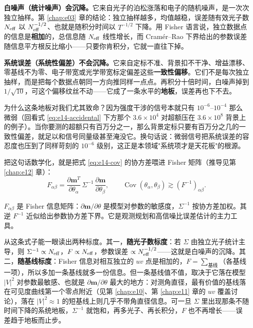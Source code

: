 \textbf{白噪声（统计噪声）会沉降。}它来自光子的泊松涨落和电子的随机噪声，是一次次独立抽样。第 \ref{chap:e03} 章的结论：独立抽样越多，均值越稳，误差随有效光子数 \(N_{\rm eff}\) 以 \(N_{\rm eff}^{-1/2}\)、也就是随积分时间以 \(T^{-1/2}\) 下降。用 Fisher 语言说，独立数据点的信息是\textbf{相加}的，总信息随 \(N_{\rm eff}\) 线性增长，而 Cramér–Rao 下界给出的参数误差随信息平方根反比缩小——只要你肯积分，它就一直往下掉。

\textbf{系统误差（系统性偏差）不会沉降。}它来自定标不准、背景扣不干净、增益漂移、零基线不为零、电子带宽或光学带宽标定偏差这些\textbf{一致性偏移}。它们不是每次独立抽样，而是把每个数据点朝同一方向推同样一点点。再积分十倍时间，白噪声掉到 \(1/\sqrt{10}\)，可这个偏移纹丝不动——它成了一条水平的\textbf{地板}，误差再也下不去。

为什么这条地板对我们尤其致命？因为强度干涉的信号本就只有 \(10^{-6}\)–\(10^{-4}\) 那么微弱（回看式 \eqref{eq:e14-accidental} 下方那个 \(3.6\times10^4\) 对超额压在 \(3.6\times10^8\) 背景上的例子）。当你要测的超额只有百万分之一，那么背景定标只要有百万分之几的一致性偏差，就足以和信号同量级甚至淹没它。换句话说：微弱信号把系统误差的容忍度也压到了同样苛刻的 \(10^{-6}\) 级别，这正是本领域"系统项才是天花板"的根源。

把这句话数学化，就是把式 \eqref{eq:e14-cov} 的协方差喂进 Fisher 矩阵（推导见第 \ref{chap:e12} 章）：
\begin{equation}
  F_{\alpha\beta}
  =\frac{\partial\bm m^{T}}{\partial\theta_\alpha}\,\Sigma^{-1}\,\frac{\partial\bm m}{\partial\theta_\beta},
  \qquad
  \operatorname{Cov}(\theta_\alpha,\theta_\beta)\gtrsim(F^{-1})_{\alpha\beta} .
  \label{eq:e14-fisher}
\end{equation}
\begin{formulaexplain}
\(F_{\alpha\beta}\) 是 Fisher 信息矩阵：\(\partial\bm m/\partial\theta\) 是模型对参数的敏感度，\(\Sigma^{-1}\) 按协方差加权。其逆 \(F^{-1}\) 近似给出参数协方差下界。它是观测规划和高信噪比误差估计的主力工具。
\end{formulaexplain}
从这条式子能一眼读出两种标度。其一，\textbf{随光子数标度}：若 \(\Sigma\) 由独立光子统计主导，则 \(\Sigma^{-1}\propto N_{\rm eff}\)，\(F\propto N_{\rm eff}\)，参数误差 \(\propto N_{\rm eff}^{-1/2}\)——这就是白噪声的沉降。其二，\textbf{随基线标度}：Fisher 信息对相互独立的 \(uv\) 点是相加的，\(F=\sum_{\text{基线}}\)（各基线一项），所以多加一条基线就多一份信息。但一条基线值不值，取决于它落在模型 \(|V|^2\) 对参数最敏感、也就是 \(\partial\bm m/\partial\theta\) 最大的地方：对测角直径，最有价值的基线落在可见度曲线第一个零点附近（见第 \ref{chap:e10}、第 \ref{chap:e11} 章的 \(uv\) 覆盖讨论），落在 \(|V|^2\approx1\) 的短基线上则几乎不带角直径信息。可一旦 \(\Sigma\) 里出现那条不随时间下降的系统地板，\(\Sigma^{-1}\) 就饱和，再多光子、再长积分，\(F\) 也不再增长——误差趋于地板而止步。

